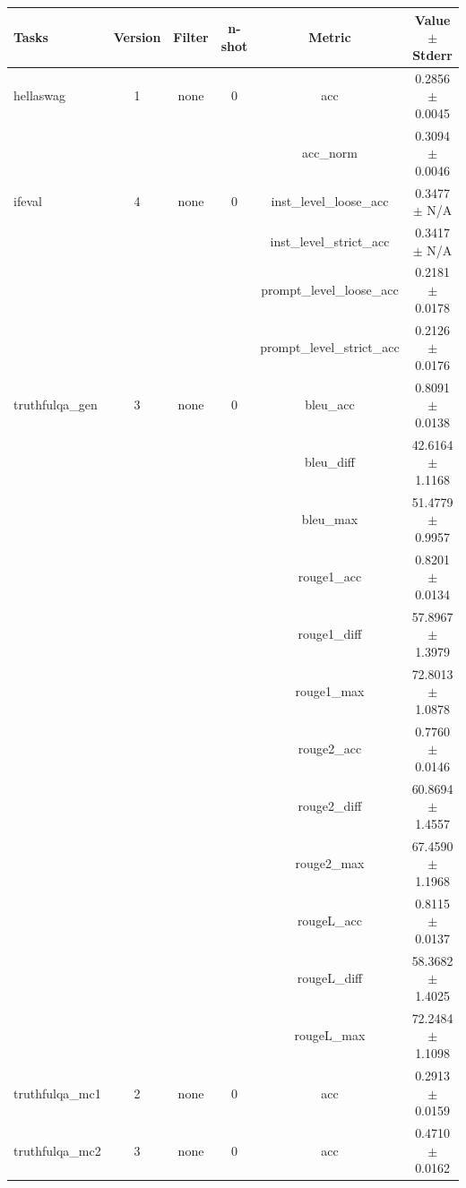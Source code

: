 \documentclass{ifacconf}
\begin{document}
\begin{strip}
\begin{minipage}{\textwidth}
			\begin{table}[H]
				\centering
				\begin{tabular}{|l|c|c|c|c|c|}
					\hline
					\textbf{Tasks} & \textbf{Version} & \textbf{Filter} & \textbf{n-shot} & \textbf{Metric} & \textbf{Value} $\pm$ \textbf{Stderr} \\ \hline
					hellaswag & 1 & none & 0 & acc & 0.2856 $\pm$ 0.0045 \\ \hline
					& & & & acc\_norm & 0.3094 $\pm$ 0.0046 \\ \hline
					ifeval & 4 & none & 0 & inst\_level\_loose\_acc & 0.3477 $\pm$ N/A \\ \hline
					& & & & inst\_level\_strict\_acc & 0.3417 $\pm$ N/A \\ \hline
					& & & & prompt\_level\_loose\_acc & 0.2181 $\pm$ 0.0178 \\ \hline
					& & & & prompt\_level\_strict\_acc & 0.2126 $\pm$ 0.0176 \\ \hline
					truthfulqa\_gen & 3 & none & 0 & bleu\_acc & 0.8091 $\pm$ 0.0138 \\ \hline
					& & & & bleu\_diff & 42.6164 $\pm$ 1.1168 \\ \hline
					& & & & bleu\_max & 51.4779 $\pm$ 0.9957 \\ \hline
					& & & & rouge1\_acc & 0.8201 $\pm$ 0.0134 \\ \hline
					& & & & rouge1\_diff & 57.8967 $\pm$ 1.3979 \\ \hline
					& & & & rouge1\_max & 72.8013 $\pm$ 1.0878 \\ \hline
					& & & & rouge2\_acc & 0.7760 $\pm$ 0.0146 \\ \hline
					& & & & rouge2\_diff & 60.8694 $\pm$ 1.4557 \\ \hline
					& & & & rouge2\_max & 67.4590 $\pm$ 1.1968 \\ \hline
					& & & & rougeL\_acc & 0.8115 $\pm$ 0.0137 \\ \hline
					& & & & rougeL\_diff & 58.3682 $\pm$ 1.4025 \\ \hline
					& & & & rougeL\_max & 72.2484 $\pm$ 1.1098 \\ \hline
					truthfulqa\_mc1 & 2 & none & 0 & acc & 0.2913 $\pm$ 0.0159 \\ \hline
					truthfulqa\_mc2 & 3 & none & 0 & acc & 0.4710 $\pm$ 0.0162 \\ \hline
				\end{tabular}
				\label{tab:gemma2_q6k}
			\end{table}
			

\end{minipage}
\end{strip}
\end{document}
